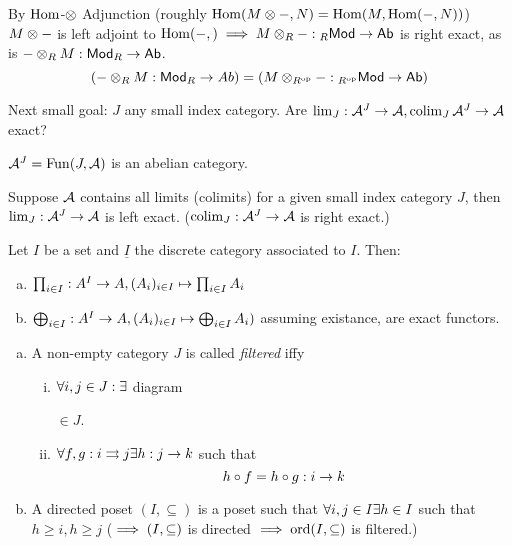 \documentclass[a4paper]{report}
\begin{document}
\begin{exmp}
  By $\operatorname{Hom}$-$\otimes$ Adjunction (roughly $\operatorname{Hom}(M \otimes -, N) = \operatorname{Hom}(M, \operatorname{Hom}(-,N))$) $M \otimes -$ is left adjoint to $\operatorname{Hom}(-,) \implies M \otimes_{R} -: {}_R\mathsf{Mod} \to \mathsf{Ab}$ is right exact, as is $- \otimes_{R} M: \mathsf{Mod}_{R} \to \mathsf{Ab}$.
  \[(- \otimes_{R} M: \mathsf{Mod}_{R} \to Ab) = (M \otimes_{R^\mathrm{op}}-: {}_{R^\mathrm{op}}\mathsf{Mod} \to \mathsf{Ab})\]
\end{exmp}

\begin{rem*}
Next small goal: $J$ any small index category. Are $\lim_{J}: \mathcal{A}^{J} \to \mathcal{A}, \operatorname*{colim}_{J}\mathcal{A}^{J} \to \mathcal{A}$ exact?
\end{rem*}


\begin{prop}
$\mathcal{A}^{J}  = \operatorname{Fun}(J,\mathcal{A})$ is an abelian category.
\end{prop}
\begin{prop}
  Suppose $\mathcal{A}$ contains all limits (colimits) for a given small index category $J$, then $\lim_{J}: \mathcal{A}^{J} \to \mathcal{A}$ is left exact. ($\operatorname*{colim}_{J}: \mathcal{A}^{J} \to \mathcal{A}$ is right exact.)
\end{prop}

\begin{cor}
  Let $I$ be a set and $\underline I$ the discrete category associated to $I$. Then:
  \begin{enumerate}[(a)]
    \item $\prod_{i \in I}: A^{I} \to A, (A_{i})_{i \in I} \mapsto \prod_{i \in I} A_{i}$
    \item $\bigoplus_{i \in I}: A^{I} \to A, (A_{i})_{i \in I} \mapsto \bigoplus_{i \in I}A_{i})$
          assuming existance, are exact functors.
  \end{enumerate}

\end{cor}



\begin{defi}
\begin{enumerate}[(a)]
  \item A non-empty category $J$ is called \emph{filtered} iffy
        \begin{enumerate}[(i)]
          \item $\forall i, j \in J: \exists$ diagram  $\in J$.
          \item $\forall f, g : i \rightrightarrows j \exists h: j \to k$ such that \[h \circ f = h \circ g: i \to k\]
        \end{enumerate}
        \item A directed poset $(I, \subseteq)$ is a poset such that $\forall i, j \in I \exists h \in I$ such that $h \ge i, h \ge j$ ($\implies (I, \subseteq)$ is directed $\implies \operatorname{ord}(I,\subseteq)$ is filtered.)

\end{enumerate}
\end{defi}
\end{document}
